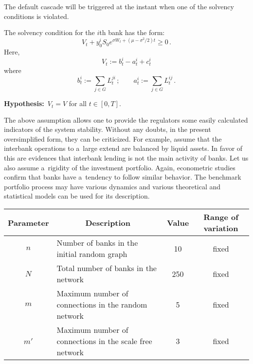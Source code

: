 \begin{multicols}{2}
The default cascade will be triggered at the instant when one of the solvency 
conditions is violated. 

The solvency condition for the $i$th bank has the form: 
\begin{equation*}
V_t  +y^i_0S_0e^{\sigma W_t+(\mu -\sigma^2/2)t}\ge 0\,.
\end{equation*}
Here, 
$$
V_t{:=}b^i_t-a^i_t +  c^i_t
$$
where
$$ 
b^i_t{:=} \sum\limits_{j\in G}L^{ji}_t\,;  
\qquad a^i_t:=\sum\limits_{j\in G}L^{ij}_t\,.
$$

\noindent
\textbf{Hypothesis:}\ $V_t=V$ for all $t\in [0,T]$. 

\smallskip

The above assumption allows one to provide the regulators some easily calculated  
indicators of the system stability. Without any doubts, in the present 
oversimplified form, they can be criticized. For example,  assume that the 
interbank operations to a~large extend are balanced by liquid assets.  In favor 
of this are evidences that interbank lending is not the main activity of banks.  
Let us also assume a~rigidity of the investment portfolio. 
Again, econometric studies confirm that banks have a~tendency to follow similar 
behavior. 
The benchmark portfolio process may have various dynamics and various 
theoretical and 
statistical models can be used for its description.  

\begin{table*}[b]\small 
    \begin{center}
\vspace*{2ex}


    \begin{tabular}{clcc}
        \hline
        Parameter & \multicolumn{1}{c}{Description} &  Value & Range of variation \\ 
        \hline
        $n$  & Number of banks in the initial random graph & 10 & fixed \\ 
        $N$  & Total number of banks in the network & 250\hphantom{9} & fixed \\
        $m$  & Maximum number of connections in the random network & \hphantom{9}5 & 
fixed \\ 
        $m'$  & Maximum number of connections in the scale free network & \hphantom{9}3 & 
fixed \\
        \hline
    \end{tabular}
  \end{center}
\end{table*}


\end{multicols}
